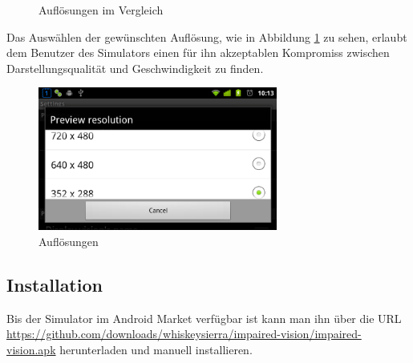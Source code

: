 \documentclass[a4paper]{article}
\begin{document}
\begin{figure}[H]
\centering
{}
\caption{Auflösungen im Vergleich}
\end{figure}

Das Auswählen der gewünschten Auflösung, wie in Abbildung \ref{resolutions} zu sehen, erlaubt dem Benutzer des Simulators einen für ihn akzeptablen Kompromiss zwischen Darstellungsqualität und Geschwindigkeit zu finden.

\begin{figure}[H]
\centering
\includegraphics[width=0.7\textwidth, trim=0 0 0 39, clip=true]{resolutions-landscape.png}
\caption{Auflösungen}
\label{resolutions}
\end{figure}

\subsection*{Installation}
Bis der Simulator im Android Market \cite{ANDROID-MARKET} verfügbar ist kann man ihn über die URL \url{https://github.com/downloads/whiskeysierra/impaired-vision/impaired-vision.apk} herunterladen und manuell installieren. 

\newpage

\nocite{ANDROID}
\nocite{GIZMODO}
\nocite{IBFB}
\printbibliography

\listoffigures

\renewcommand\listoflistingscaption{Quellcodeverzeichnis}
\listoflistings
\end{document}
